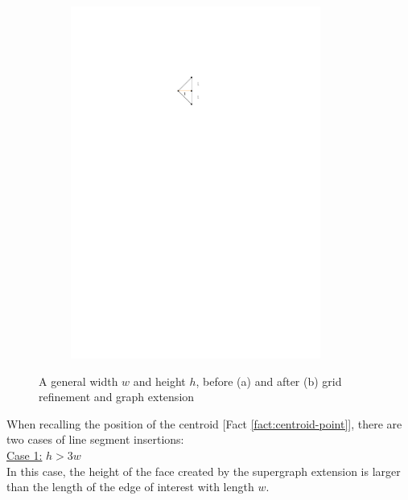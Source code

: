 \begin{figure}[H]
\begin{subfigure}{0.4\linewidth}
		\includegraphics[width=0.9\textwidth,page=5]{drawings/maximal_planar.pdf}
		\caption{}
	\end{subfigure}
	\caption{A general width $w$ and height $h$, before (a) and after (b) grid refinement and graph extension}\label{im:h_greater_3w}
\end{figure}
When recalling the position of the centroid [Fact \ref{fact:centroid-point}], there are two cases of line segment insertions:\\
\underline{Case 1:} $h > 3w$\\
In this case, the height of the face created by the supergraph extension is larger than the length of the edge of interest with length $w$. 
